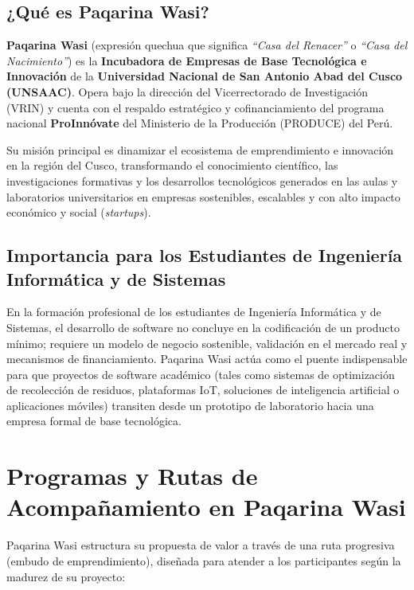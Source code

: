 ﻿\documentclass[12pt,a4paper]{article}
\begin{document}
\subsection{¿Qué es Paqarina Wasi?}
\textbf{Paqarina Wasi} (expresión quechua que significa \textit{``Casa del Renacer''} o \textit{``Casa del Nacimiento''}) es la \textbf{Incubadora de Empresas de Base Tecnológica e Innovación} de la \textbf{Universidad Nacional de San Antonio Abad del Cusco (UNSAAC)}. Opera bajo la dirección del Vicerrectorado de Investigación (VRIN) y cuenta con el respaldo estratégico y cofinanciamiento del programa nacional \textbf{ProInnóvate} del Ministerio de la Producción (PRODUCE) del Perú.

Su misión principal es dinamizar el ecosistema de emprendimiento e innovación en la región del Cusco, transformando el conocimiento científico, las investigaciones formativas y los desarrollos tecnológicos generados en las aulas y laboratorios universitarios en empresas sostenibles, escalables y con alto impacto económico y social (\textit{startups}).

\subsection{Importancia para los Estudiantes de Ingeniería Informática y de Sistemas}
En la formación profesional de los estudiantes de Ingeniería Informática y de Sistemas, el desarrollo de software no concluye en la codificación de un producto mínimo; requiere un modelo de negocio sostenible, validación en el mercado real y mecanismos de financiamiento. Paqarina Wasi actúa como el puente indispensable para que proyectos de software académico (tales como sistemas de optimización de recolección de residuos, plataformas IoT, soluciones de inteligencia artificial o aplicaciones móviles) transiten desde un prototipo de laboratorio hacia una empresa formal de base tecnológica.

\section{Programas y Rutas de Acompañamiento en Paqarina Wasi}

Paqarina Wasi estructura su propuesta de valor a través de una ruta progresiva (embudo de emprendimiento), diseñada para atender a los participantes según la madurez de su proyecto:
\end{document}
